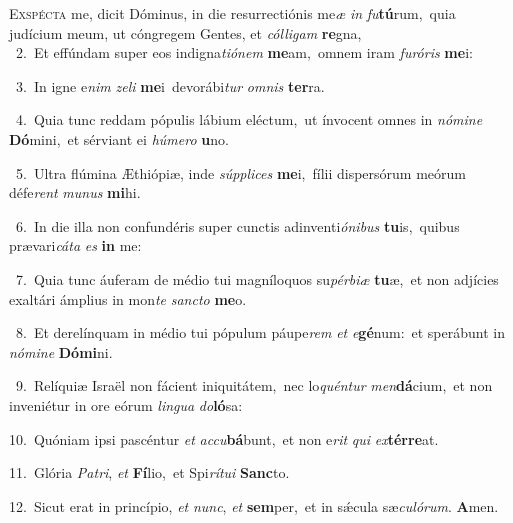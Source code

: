 \lettrine{\initial\textcolor{\initialcolor}{E}}{xspécta} me, dicit Dóminus, in die resurrectiónis me\textit{æ} \textit{in} \textit{fu}\-\textbf{tú}rum,~\star quia judícium meum, ut cóngregem Gentes, et \textit{cól}\-\textit{li}\textit{gam} \textbf{re}\-gna,\\
{\numbfont\textcolor{\numbcolor}{~2.}}~Et effúndam super eos indigna\-\textit{ti}\-\textit{ó}\textit{nem} \textbf{me}\-am,~\star omnem iram \textit{fu}\-\textit{ró}\textit{ris} \textbf{me}\-i:\par
{\numbfont\textcolor{\numbcolor}{~3.}}~In igne e\textit{nim} \textit{ze}\-\textit{li} \textbf{me}\-i~\star devorábi\textit{tur} \textit{om}\-\textit{nis} \textbf{ter}\-ra.\par
{\numbfont\textcolor{\numbcolor}{~4.}}~Quia tunc reddam pópulis lábium eléctum,~\dagger ut ínvocent omnes in \textit{nó}\-\textit{mi}\textit{ne} \textbf{Dó}\-mini,~\star et sérviant ei \textit{hú}\-\textit{me}\textit{ro} \textbf{u}\-no.\par
{\numbfont\textcolor{\numbcolor}{~5.}}~Ultra flúmina Æthiópiæ, inde \textit{súp}\-\textit{pli}\textit{ces} \textbf{me}\-i,~\star fílii dispersórum meórum défe\textit{rent} \textit{mu}\-\textit{nus} \textbf{mi}\-hi.\par
{\numbfont\textcolor{\numbcolor}{~6.}}~In die illa non confundéris super cunctis adinventi\-\textit{ó}\-\textit{ni}\textit{bus} \textbf{tu}\-is,~\star quibus prævari\-\textit{cá}\-\textit{ta} \textit{es} \textbf{in} me:\par
{\numbfont\textcolor{\numbcolor}{~7.}}~Quia tunc áuferam de médio tui magníloquos su\-\textit{pér}\-\textit{bi}\textit{æ} \textbf{tu}\-æ,~\star et non adjícies exaltári ámplius in mon\textit{te} \textit{sanc}\-\textit{to} \textbf{me}\-o.\par
{\numbfont\textcolor{\numbcolor}{~8.}}~Et derelínquam in médio tui pópulum páupe\textit{rem} \textit{et} \textit{e}\-\textbf{gé}num:~\star et sperábunt in \textit{nó}\-\textit{mi}\textit{ne} \textbf{Dó}\-\textbf{mi}ni.\par
{\numbfont\textcolor{\numbcolor}{~9.}}~Relíquiæ Israël non fácient iniquitátem,~\dagger nec lo\-\textit{quén}\-\textit{tur} \textit{men}\-\textbf{dá}cium,~\star et non inveniétur in ore eórum \textit{lin}\-\textit{gua} \textit{do}\-\textbf{ló}sa:\par
{\numbfont\textcolor{\numbcolor}{10.}}~Quóniam ipsi pascéntur \textit{et} \textit{ac}\-\textit{cu}\textbf{bá}bunt,~\star et non e\textit{rit} \textit{qui} \textit{ex}\-\textbf{tér}\textbf{re}at.\par
{\numbfont\textcolor{\numbcolor}{11.}}~Glória \textit{Pa}\-\textit{tri}, \textit{et} \textbf{Fí}\-lio,~\star et Spi\-\textit{rí}\-\textit{tu}\textit{i} \textbf{Sanc}\-to.\par
{\numbfont\textcolor{\numbcolor}{12.}}~Sicut erat in princípio, \textit{et} \textit{nunc}\-, \textit{et} \textbf{sem}\-per,~\star et in sǽcula sæ\-\textit{cu}\-\textit{ló}\textit{rum}. \textbf{A}\-men.\par
